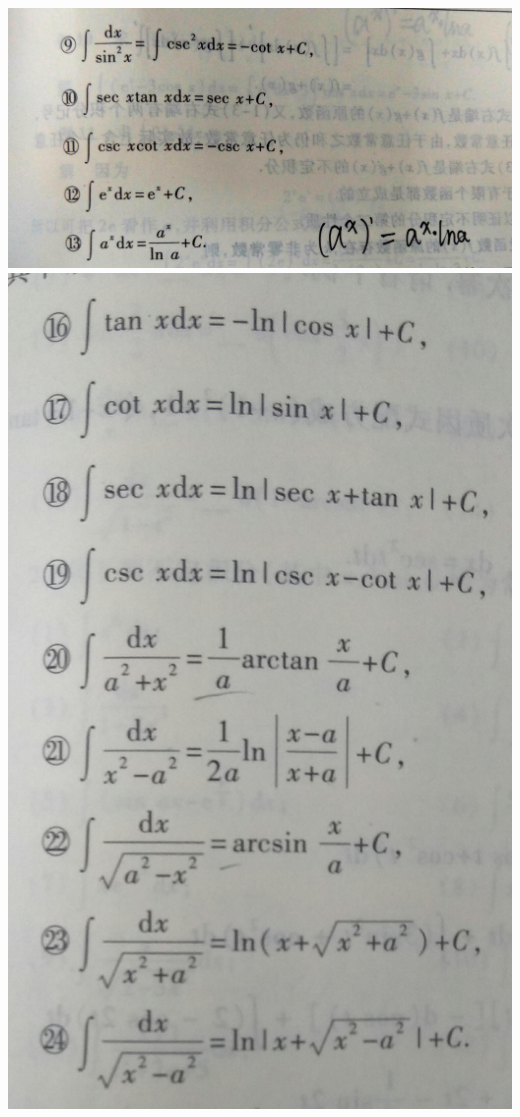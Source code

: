 \documentclass[11pt]{article}
\makeatletter
\def\maxwidth{\ifdim\Gin@nat@width>\linewidth\linewidth
    \else\Gin@nat@width\fi}
\let\Oldincludegraphics\includegraphics
\renewcommand{\includegraphics}[1]{\Oldincludegraphics[width=.8\maxwidth]{#1}}
\makeatother
\begin{document}
\begin{enumerate}
  \includegraphics{9345E7/4FEE9C843E57935F87D1E16F255FA43E.jpg}
  \includegraphics{9345E7/D70CA37458BBD6E13C00ADA8D5740222.jpg}

\end{enumerate}
\end{document}
